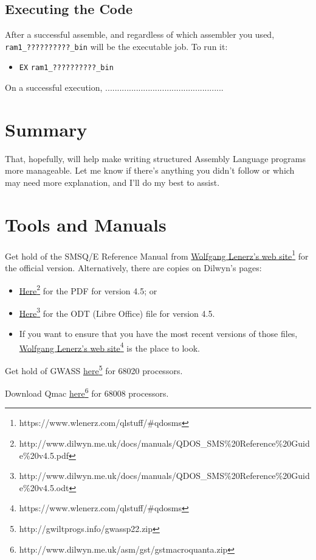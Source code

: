\subsection{Executing the Code}

After a successful assemble, and regardless of which assembler you
used, \texttt{ram1\_??????????\_bin} will be the executable job. To
run it:
\begin{itemize}
\item \texttt{EX} \texttt{ram1\_??????????\_bin}
\end{itemize}
On a successful execution, ..................................................

\section{Summary}

That, hopefully, will help make writing structured Assembly Language
programs more manageable. Let me know if there's anything you didn't
follow or which may need more explanation, and I'll do my best to
assist.

\section{Tools and Manuals\label{sec:Tools-and-Manuals}}

Get hold of the SMSQ/E Reference Manual from \href{https://www.wlenerz.com/qlstuff/\#qdosms}{Wolfgang Lenerz's web site}\footnote{https://www.wlenerz.com/qlstuff/\#qdosms}
for the official version. Alternatively, there are copies on Dilwyn's
pages:
\begin{itemize}
\item \href{http://www.dilwyn.me.uk/docs/manuals/QDOS_SMS\%20Reference\%20Guide\%20v4.5.pdf}{Here}\footnote{http://www.dilwyn.me.uk/docs/manuals/QDOS\_SMS\%20Reference\%20Guide\%20v4.5.pdf}
for the PDF for version 4.5; or
\item \href{http://www.dilwyn.me.uk/docs/manuals/QDOS_SMS\%20Reference\%20Guide\%20v4.5.odt}{Here}\footnote{http://www.dilwyn.me.uk/docs/manuals/QDOS\_SMS\%20Reference\%20Guide\%20v4.5.odt}
for the ODT (Libre Office) file for version 4.5.
\item If you want to ensure that you have the most recent versions of those
files, \href{https://www.wlenerz.com/qlstuff/\#qdosms}{Wolfgang Lenerz's web site}\footnote{https://www.wlenerz.com/qlstuff/\#qdosms}
is the place to look.
\end{itemize}
Get hold of GWASS \href{http://gwiltprogs.info/gwassp22.zip}{here}\footnote{http://gwiltprogs.info/gwassp22.zip}
for 68020 processors.

Download Qmac \href{http://www.dilwyn.me.uk/asm/gst/gstmacroquanta.zip}{here}\footnote{http://www.dilwyn.me.uk/asm/gst/gstmacroquanta.zip}
for 68008 processors.
